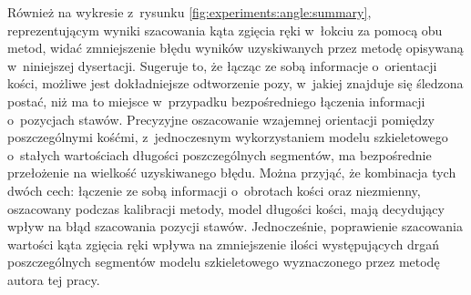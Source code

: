Również na wykresie z~rysunku \ref{fig:experiments:angle:summary}, reprezentującym wyniki szacowania kąta zgięcia ręki w~łokciu za pomocą obu metod, widać zmniejszenie błędu wyników uzyskiwanych przez metodę opisywaną w~niniejszej dysertacji. Sugeruje to, że łącząc ze sobą informacje o~orientacji kości, możliwe jest dokładniejsze odtworzenie pozy, w~jakiej znajduje się śledzona postać, niż ma to miejsce w~przypadku bezpośredniego łączenia informacji o~pozycjach stawów. Precyzyjne oszacowanie wzajemnej orientacji pomiędzy poszczególnymi kośćmi, z~jednoczesnym wykorzystaniem modelu szkieletowego o~stałych wartościach długości poszczególnych segmentów, ma bezpośrednie przełożenie na wielkość uzyskiwanego błędu. Można przyjąć, że kombinacja tych dwóch cech: łączenie ze sobą informacji o~obrotach kości oraz niezmienny, oszacowany podczas kalibracji metody, model długości kości, mają decydujący wpływ na błąd szacowania pozycji stawów. Jednocześnie, poprawienie szacowania wartości kąta zgięcia ręki wpływa na zmniejszenie ilości występujących drgań poszczególnych segmentów modelu szkieletowego wyznaczonego przez metodę autora tej pracy.